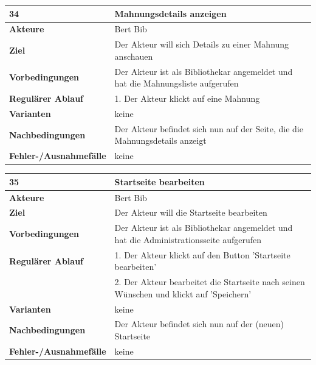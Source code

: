 \documentclass[fontsize=12pt,paper=a4,twoside]{scrartcl}
\begin{document}
\begin{table}[htbp]
\label{34}
\begin{tabular}{|l|p{10cm}|}
\hline 
\textbf{34} & \textbf{Mahnungsdetails anzeigen} \\ \hline
\textbf{Akteure} & Bert Bib\\ \hline
\textbf{Ziel} & Der Akteur will sich Details zu einer Mahnung anschauen \\ \hline
\textbf{Vorbedingungen} & Der Akteur ist als Bibliothekar angemeldet und hat die Mahnungsliste 
aufgerufen \\ \hline
\textbf{Regulärer Ablauf} & 
1. Der Akteur klickt auf eine Mahnung \\
\hline
\textbf{Varianten} & 
keine \\ \hline
\textbf{Nachbedingungen} & Der Akteur befindet sich nun auf der Seite, die die Mahnungsdetails 
anzeigt\\ \hline
\textbf{Fehler-/Ausnahmefälle} & keine\\
\hline
\end{tabular}
\end{table}

\begin{table}[htbp]
\label{35}
\begin{tabular}{|l|p{10cm}|}
\hline 
\textbf{35} & \textbf{Startseite bearbeiten} \\ \hline
\textbf{Akteure} & Bert Bib\\ \hline
\textbf{Ziel} & Der Akteur will die Startseite bearbeiten \\ \hline
\textbf{Vorbedingungen} & Der Akteur ist als Bibliothekar angemeldet und hat die 
Administrationsseite aufgerufen\\\hline
\textbf{Regulärer Ablauf} & 
1. Der Akteur klickt auf den Button 'Startseite bearbeiten' \\
&2. Der Akteur bearbeitet die Startseite nach seinen Wünschen und klickt auf 'Speichern'\\
\hline
\textbf{Varianten} & 
keine \\ \hline
\textbf{Nachbedingungen} & Der Akteur befindet sich nun auf der (neuen) Startseite \\ \hline
\textbf{Fehler-/Ausnahmefälle} & keine\\
\hline
\end{tabular}
\end{table}
\end{document}
